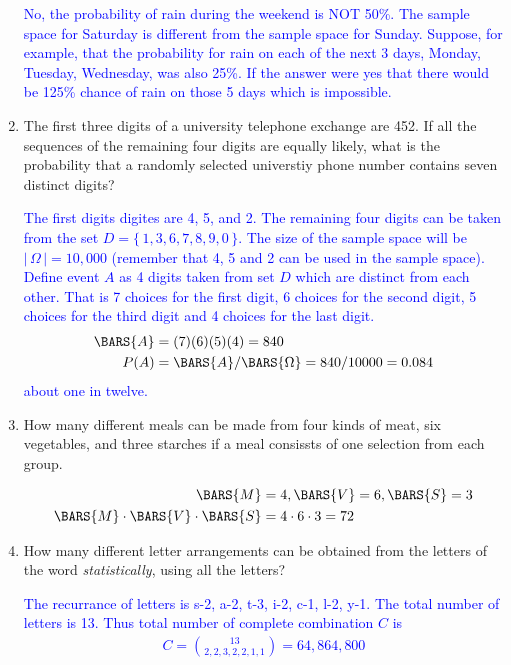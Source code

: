 \documentclass[10pt,a4paper]{report}
\newcommand{\BLUE}[1]{\textcolor{blue}{#1}}
\begin{document}
\begin{enumerate}
\BLUE{	
	No, the probability of rain during the weekend is NOT 50\%. The sample space for Saturday is different from the sample space for Sunday.  Suppose, for example, that the probability for rain on each of the next 3 days, Monday, Tuesday, Wednesday, was also 25\%.  If the answer were yes that there would be 125\% chance of rain on those 5 days which is impossible. }
	
	\setcounter{enumi}{10}
	\item The first three digits of a university telephone exchange are 452.  If all the sequences of the remaining four digits are equally likely, what is the probability that a randomly selected universtiy phone number contains seven distinct digits?
	
\BLUE{The first digits digites are 4, 5, and 2.  The remaining four digits can be taken from the set $D=\{\, 1,3,6,7,8,9,0\,\}$.  The size of the sample space will be $|\,\Omega\,| = 10,000$ (remember that 4, 5 and 2 can be used in the sample space). Define event $A$ as 4 digits taken from set $D$ which are distinct from each other.  That is 7 choices for the first digit, 6 choices for the second digit, 5 choices for the third digit and 4 choices for the last digit.
\begin{align*}
	\BARS{A} &= (7)(6)(5)(4) = 840 \\
	P(A) &= \BARS{A}/\BARS{\Omega} = 840/10000 = 0.084
\end{align*}about one in twelve.
}
	\setcounter{enumi}{14}
	\item How many different meals can be made from four kinds of meat, six vegetables, and three starches if a meal consissts of one selection from each group.
	
\BLUE{\begin{align*}
	\BARS{M} &= 4, \BARS{V} = 6, \BARS{S} = 3\\
	\BARS{M} \cdot \BARS{V}\cdot\BARS{S} &= 4 \cdot 6 \cdot 3 = 72
\end{align*}
}

	\item How many different letter arrangements can be obtained from the letters of the word \textit{statistically}, using all the letters?
	
	\BLUE{
	The recurrance of letters is s-2, a-2, t-3, i-2, c-1, l-2, y-1.  The total number of letters is 13.  Thus total number of complete combination $C$ is
	\begin{align*}
		C = \binom{13}{2,2,3,2,2,1,1} = 64,864,800
	\end{align*} }

\end{enumerate}
\end{document}

